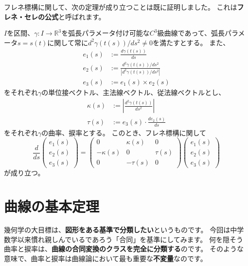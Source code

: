 フレネ標構に関して、次の定理が成り立つことは既に証明しました。
これは\textbf{フレネ・セレの公式}と呼ばれます。
\begin{theorem}
  $I$を区間、$\gamma:I\to\mathbb{R}^3$を弧長パラメータ付け可能な$C^3$級曲線であって、弧長パラメータ$s=s(t)$に関して常に$d^2\gamma(t(s))/ds^2\neq0$を満たすとする。
  また、
  \begin{align*}
    e_1(s)&:=\frac{d\gamma(t(s))}{ds}\\
    e_2(s)&:=\frac{d^2\gamma(t(s))/ds^2}{|d^2\gamma(t(s))/ds^2|}\\
    e_3(s)&:=e_1(s)\times e_2(s)
  \end{align*}
  をそれぞれ$\gamma$の単位接ベクトル、主法線ベクトル、従法線ベクトルとし、
  \begin{align*}
    \kappa(s)&:=\left|\frac{d^2\gamma(t(s))}{ds^2}\right|\\
    \tau(s)&:=e_3(s)\cdot\frac{de_2(s)}{ds}
  \end{align*}
  をそれぞれ$\gamma$の曲率、捩率とする。
  このとき、フレネ標構に関して
  \[
    \frac{d}{ds}
    \begin{pmatrix}
      e_1(s)\\
      e_2(s)\\
      e_3(s)
    \end{pmatrix}
    =
    \begin{pmatrix}
      0 & \kappa(s) & 0 \\
      -\kappa(s) & 0 & \tau(s) \\
      0 & -\tau(s) & 0
    \end{pmatrix}
    \begin{pmatrix}
      e_1(s)\\
      e_2(s)\\
      e_3(s)
    \end{pmatrix}
  \]
  が成り立つ。
\end{theorem}

\section{曲線の基本定理}

幾何学の大目標は、\textbf{図形をある基準で分類したい}というものです。
今回は中学数学以来慣れ親しんでいるであろう「合同」を基準にしてみます。
何を隠そう曲率と捩率は、\textbf{曲線の合同変換のクラスを完全に分類する}のです。
そのような意味で、曲率と捩率は曲線論において最も重要な\textbf{不変量}なのです。

